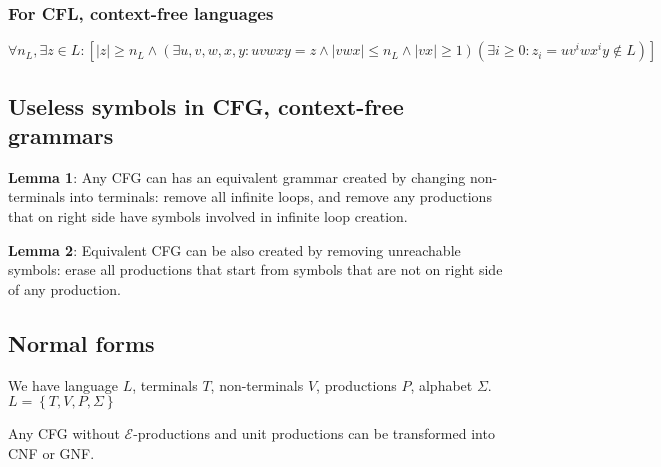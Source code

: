 \documentclass{article}
\begin{document}
\subsubsection{For CFL, context-free languages}
$\forall n_L , \exists z \in L : 
\left[
|z| \geq n_L 
\wedge \left( \exists u,v,w,x,y : uvwxy = z \wedge |vwx| \leq n_L \wedge |vx| \geq 1 \right)
\left( \exists i \geq 0 : z_i = uv^iwx^iy \not\in L \right) 
\right]$

% 

\subsection{Useless symbols in CFG, context-free grammars}
\noindent \textbf{Lemma 1}:
Any CFG can has an equivalent grammar created by changing non-terminals into terminals: remove all
infinite loops, and remove any productions that on right side have symbols involved in infinite loop
creation.

\noindent \textbf{Lemma 2}:
Equivalent CFG can be also created by removing unreachable symbols: erase all productions that start
from symbols that are not on right side of any production.

\subsection{Normal forms}
We have language $L$, terminals $T$, non-terminals $V$, productions $P$, alphabet $\Sigma$.
$L = \left\{ T, V, P, \Sigma  \right\} $

Any CFG without $\mathcal{E}$-productions and unit productions can be transformed into CNF or GNF.
\end{document}

